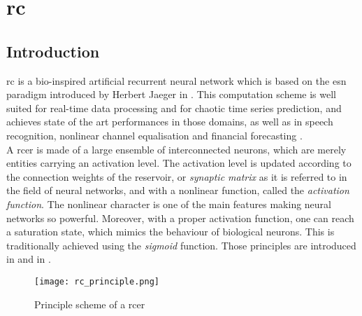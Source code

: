 \chapter{\acrlong{rc}}

\section{Introduction}

\gls{rc} is a bio-inspired artificial recurrent neural network which is based on the \gls{esn} paradigm introduced by Herbert Jaeger in \cite{Jaeger2004}. This computation scheme is well suited for real-time data processing and for chaotic time series prediction\cite{Jaeger2004, JaegerH.2001Tesa, Lukoeviius2012}, and achieves state of the art performances in those domains, as well as in speech recognition\cite{Verstraeten2006, NIPS2010_4056, Jaeger2007}, nonlinear channel equalisation\cite{Jaeger2004} and financial forecasting \cite{financialTimeSeries}.\\

A \gls{rcer} is made of a large ensemble of interconnected neurons, which are merely entities carrying an activation level. The activation level  is updated according to the connection weights of the reservoir, or \emph{synaptic matrix} as it is referred to in the field of neural networks, and with a nonlinear function, called the \textit{activation function}. The nonlinear character is one of the main features making neural networks so powerful. Moreover, with a proper activation function, one can reach a saturation state, which mimics the behaviour of biological neurons. This is traditionally achieved using the \textit{sigmoid} function. Those principles are introduced in \cite[p.227-228]{bishop2006pattern} and in \cite[p.727-728]{russell2010artificial}.\\

\begin{figure}[h]
	\centering
	\texttt{[image: rc\_principle.png]}
	\caption{Principle scheme of a \acrshort{rcer} \cite{financialTimeSeries}}
	\label{rc_principle}
\end{figure}

